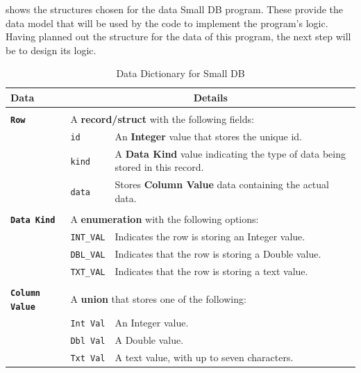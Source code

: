  shows the structures chosen for the data Small DB program. These provide the data model that will be used by the code to implement the program's logic. Having planned out the structure for the data of this program, the next step will be to design its logic.

\begin{table}[htbp]
  \centering
  \begin{tabular}{|l|l|l|}
    \hline
    \textbf{Data} & \multicolumn{2}{c|}{\textbf{Details}}  \\ 
    \hline
    \multicolumn{3}{c}{} \\
    \hline
    \textbf{\texttt{Row}} & \multicolumn{2}{l|}{A \textbf{record/struct} with the following fields:}  \\
    \hline
    & \texttt{id} & An \textbf{Integer} value that stores the unique id. \\
    \hline
    & \texttt{kind} & A \textbf{Data Kind} value indicating the type of data being stored in this record. \\
    \hline
    & \texttt{data} & Stores \textbf{Column Value} data containing the actual data. \\ 
    \hline
    \multicolumn{3}{c}{} \\
    \hline
    \textbf{\texttt{Data Kind}} & \multicolumn{2}{l|}{A \textbf{enumeration} with the following options:}\\
    \hline
    & \texttt{INT\_VAL} & Indicates the row is storing an Integer value. \\
    \hline
    & \texttt{DBL\_VAL} & Indicates that the row is storing a Double value. \\
    \hline
    &  \texttt{TXT\_VAL} & Indicates that the row is storing a text value. \\
    \hline
    \multicolumn{3}{c}{} \\
    \hline
    \textbf{\texttt{Column Value}} & \multicolumn{2}{l|}{A \textbf{union} that stores one of the following:}\\
    \hline
    & \texttt{Int Val} & An Integer value. \\
    \hline 
    & \texttt{Dbl Val} & A Double value. \\
    \hline
    & \texttt{Txt Val} & A text value, with up to seven characters. \\
    \hline
  \end{tabular}
  \caption{Data Dictionary for Small DB}
  \label{tbl:dd-small-db}
\end{table}

